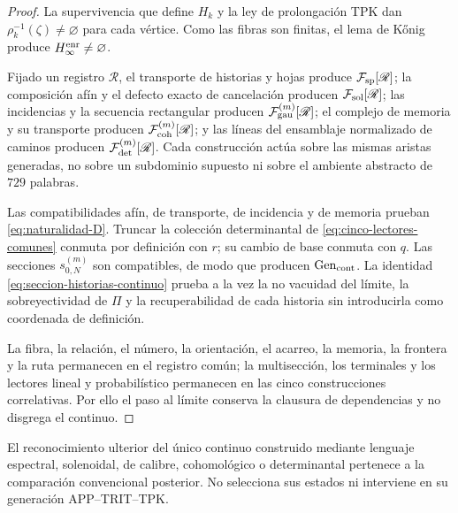 \begin{proof}
La supervivencia que define \(H_k\) y la ley de prolongación TPK dan
\(\rho_k^{-1}(\zeta)\neq\varnothing\) para cada vértice. Como las fibras son
finitas, el lema de Kőnig produce \(H_\infty^{\rm enr}\neq\varnothing\).

Fijado un registro \(\mathscr R\), el transporte de historias y hojas produce
\(\mathcal F_{\rm sp}[\mathscr R]\); la composición afín y el defecto exacto
de cancelación producen \(\mathcal F_{\rm sol}[\mathscr R]\); las incidencias
y la secuencia rectangular producen \(\mathcal F_{\rm gau}^{(m)}[\mathscr R]\);
el complejo de memoria y su transporte producen
\(\mathcal F_{\rm coh}^{(m)}[\mathscr R]\); y las líneas del ensamblaje
normalizado de caminos producen \(\mathcal F_{\rm det}^{(m)}[\mathscr R]\).
Cada construcción actúa sobre las mismas aristas generadas, no sobre un
subdominio supuesto ni sobre el ambiente abstracto de \(729\) palabras.

Las compatibilidades afín, de transporte, de incidencia y de memoria prueban
\eqref{eq:naturalidad-D}. Truncar la colección determinantal de
\eqref{eq:cinco-lectores-comunes} conmuta por
definición con \(r\); su cambio de base conmuta con \(q\). Las secciones
\(s_{0,N}^{(m)}\) son compatibles, de modo que producen
\(\operatorname{Gen}_{\rm cont}\). La identidad
\eqref{eq:seccion-historias-continuo} prueba a la vez la no
vacuidad del límite, la sobreyectividad de \(\Pi\) y la recuperabilidad de cada
historia sin introducirla como coordenada de definición.

La fibra, la relación, el número, la orientación, el acarreo, la memoria, la
frontera y la ruta permanecen en el registro común; la multisección, los
terminales y los lectores lineal y probabilístico permanecen en las cinco
construcciones correlativas. Por ello el paso al límite conserva la clausura de
dependencias y no disgrega el continuo.
\end{proof}

El reconocimiento ulterior del único continuo construido mediante lenguaje
espectral, solenoidal, de calibre, cohomológico o determinantal pertenece a la
comparación convencional posterior. No selecciona sus estados ni interviene en
su generación APP--TRIT--TPK.
